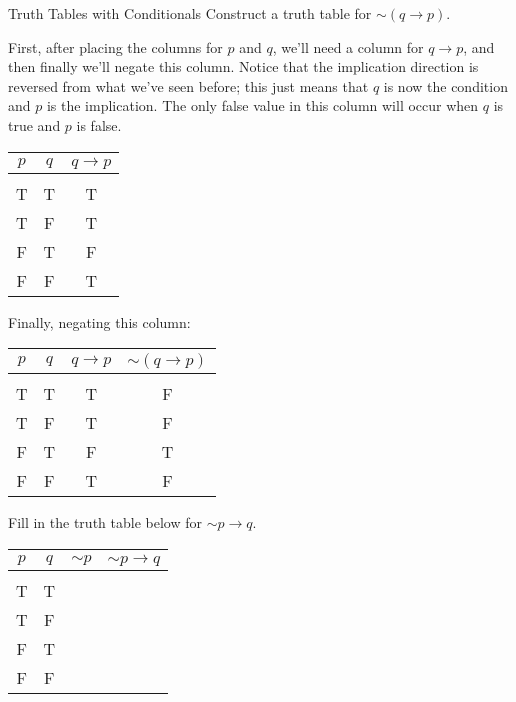 \begin{example}[https://www.youtube.com/watch?v=Tx2r1SRMsKc]{Truth Tables with Conditionals}
Construct a truth table for $\sim (q \to p)$.

\sol
First, after placing the columns for $p$ and $q$, we'll need a column for $q \to p$, and then finally we'll negate this column.  Notice that the implication direction is reversed from what we've seen before; this just means that $q$ is now the condition and $p$ is the implication.  The only false value in this column will occur when $q$ is true and $p$ is false.
\begin{center}
\begin{tabular}{|c c c|}
\hline
$p$ & $q$ & $q \to p$\\
\hline
& & \\
T & T & T\\
T & F & T\\
F & T & F\\
F & F & T\\
\hline
\end{tabular}
\end{center}

Finally, negating this column:
\begin{center}
{\color{green!30!black}
\begin{tabular}{|c c c c|}
\hline
$p$ & $q$ & $q \to p$ & $\sim (q \to p)$\\
\hline
& & &\\
T & T & T & F\\
T & F & T & F\\
F & T & F & T\\
F & F & T & F\\
\hline
\end{tabular}}
\end{center}
\end{example}

\begin{try}
Fill in the truth table below for $\sim p \to q$.
\begin{center}
\begin{tabular}{|c c c c|}
\hline
$p$ & $q$ & $\sim p$ & $\sim p \to q$\\
\hline
& && \\
T & T & &\\
T & F & &\\
F & T & &\\
F & F & &\\
\hline
\end{tabular}
\end{center}
\end{try}


